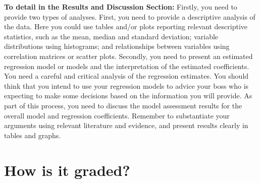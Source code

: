 \documentclass[
  letterpaper,
  DIV=11,
  numbers=noendperiod]{scrreprt}
\begin{document}
\textbf{To detail in the Results and Discussion Section:} Firstly, you
need to provide two types of analyses. First, you need to provide a
descriptive analysis of the data. Here you could use tables and/or plots
reporting relevant descriptive statistics, such as the mean, median and
standard deviation; variable distributions using histograms; and
relationships between variables using correlation matrices or scatter
plots. Secondly, you need to present an estimated regression model or
models and the interpretation of the estimated coefficients. You need a
careful and critical analysis of the regression estimates. You should
think that you intend to use your regression models to advice your boss
who is expecting to make some decisions based on the information you
will provide. As part of this process, you need to discuss the model
assessment results for the overall model and regression coefficients.
Remember to substantiate your arguments using relevant literature and
evidence, and present results clearly in tables and graphs.

\section*{How is it graded?}\label{how-is-it-graded}

\end{document}
